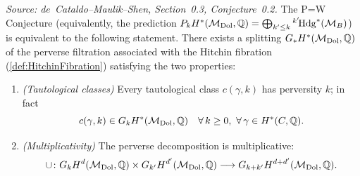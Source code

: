 \begin{conjecture}[Equivalent version of P=W]
  \label{conj:PW_splitting}
  \textit{Source: de~Cataldo--Maulik--Shen, Section~0.3, Conjecture~0.2.}
  The P=W Conjecture (equivalently, the prediction
  \(P_k H^*(\mathcal{M}_{\mathrm{Dol}},\mathbb{Q}) = \bigoplus_{k' \leq k} {}^{k'}\!\mathrm{Hdg}^{*}(\mathcal{M}_B)\)) is
  equivalent to the following statement.  There exists a splitting
  \(G_* H^*(\mathcal{M}_{\mathrm{Dol}},\mathbb{Q})\) of the perverse filtration associated with the
  Hitchin fibration (\cref{def:HitchinFibration}) satisfying the two
  properties:
  \begin{enumerate}
    \item[(a)] \emph{(Tautological classes)} Every tautological class
      \(c(\gamma,k)\) has perversity \(k\); in fact
      \[
        c(\gamma,k) \in G_k H^*(\mathcal{M}_{\mathrm{Dol}},\mathbb{Q})
        \quad \forall\, k \geq 0, \ \forall\, \gamma \in H^*(C,\mathbb{Q}).
      \]
    \item[(b)] \emph{(Multiplicativity)} The perverse decomposition is
      multiplicative:
      \[
        \cup \colon G_k H^d(\mathcal{M}_{\mathrm{Dol}},\mathbb{Q}) \times G_{k'} H^{d'}(\mathcal{M}_{\mathrm{Dol}},\mathbb{Q})
          \longrightarrow G_{k+k'} H^{d+d'}(\mathcal{M}_{\mathrm{Dol}},\mathbb{Q}).
      \]
  \end{enumerate}
\end{conjecture}

